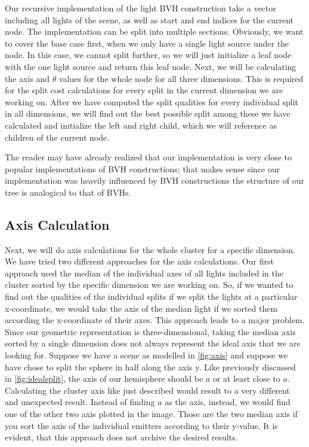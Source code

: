 Our recursive implementation of the light BVH construction take a vector including all lights of the scene, as well as start and end indices for the current node. The implementation can be split into multiple sections. Obviously, we want to cover the base case first, when we only have a single light source under the node. In this case, we cannot split further, so we will just initialize a leaf node with the one light source and return this leaf node. Next, we will be calculating the axis and $\theta$ values for the whole node for all three dimensions. This is required for the split cost calculations for every split in the current dimension we are working on. After we have computed the split qualities for every individual split in all dimensions, we will find out the best possible split among these we have calculated and initialize the left and right child, which we will reference as children of the current node.

The reader may have already realized that our implementation is very close to popular implementations of BVH constructions; that makes sense since our implementation was heavily influenced by BVH constructions the structure of our tree is analogical to that of BVHs.

\subsection{Axis Calculation}
\label{subs:axis}

Next, we will do axis calculations for the whole cluster for a specific dimension. We have tried two different approaches for the axis calculations. Our first approach used the median of the individual axes of all lights included in the cluster sorted by the specific dimension we are working on. So, if we wanted to find out the qualities of the individual splits if we split the lights at a particular x-coordinate, we would take the axis of the median light if we sorted them according the x-coordinate of their axes. This approach leads to a major problem. Since our geometric representation is three-dimensional, taking the median axis sorted by a single dimension does not always represent the ideal axis that we are looking for. Suppose we have a scene as modelled in \ref{fig:axis} and suppose we have chose to split the sphere in half along the axis y. Like previously discussed in \ref{fig:idealsplit}, the axis of our hemisphere should be $a$ or at least close to $a$. Calculating the cluster axis like just described would result to a very different and unexpected result. Instead of finding $a$ as the axis, instead, we would find one of the other two axis plotted in the image. Those are the two median axis if you sort the axis of the individual emitters according to their y-value. It is evident, that this approach does not archive the desired results. 

